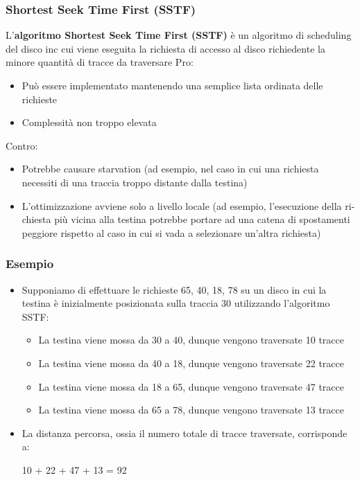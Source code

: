 \documentclass{article}
\begin{document}
\subsubsection{Shortest Seek Time First (SSTF)}
L'\textbf{algoritmo Shortest Seek Time First (SSTF)} è un algoritmo di scheduling del disco inc cui viene eseguita la richiesta di accesso al disco richiedente la minore quantità di tracce da traversare
Pro:
\begin{itemize}
    \item Può essere implementato mantenendo una semplice lista ordinata delle richieste
    \item Complessità non troppo elevata
\end{itemize}
Contro:
\begin{itemize}
    \item Potrebbe causare starvation (ad esempio, nel caso in cui una richiesta necessiti di una traccia troppo distante dalla testina)
    \item L'ottimizzazione avviene solo a livello locale (ad esempio, l'esecuzione della ri- chiesta più vicina alla testina potrebbe portare ad una catena di spostamenti peggiore rispetto al caso in cui si vada a selezionare un'altra richiesta)
\end{itemize}


\subsubsection{Esempio}
\begin{itemize}
    \item Supponiamo di effettuare le richieste 65, 40, 18, 78 su un disco in cui la testina è inizialmente posizionata sulla traccia 30 utilizzando l'algoritmo SSTF:
    \begin{itemize}
        \item La testina viene mossa da 30 a 40, dunque vengono traversate 10 tracce 
        \item La testina viene mossa da 40 a 18, dunque vengono traversate 22 tracce 
        \item La testina viene mossa da 18 a 65, dunque vengono traversate 47 tracce 
        \item La testina viene mossa da 65 a 78, dunque vengono traversate 13 tracce
    \end{itemize}
    \item La distanza percorsa, ossia il numero totale di tracce traversate, corrisponde a:
    \begin{center}
        10 + 22 + 47 + 13 = 92
    \end{center}
\end{itemize}
\end{document}
